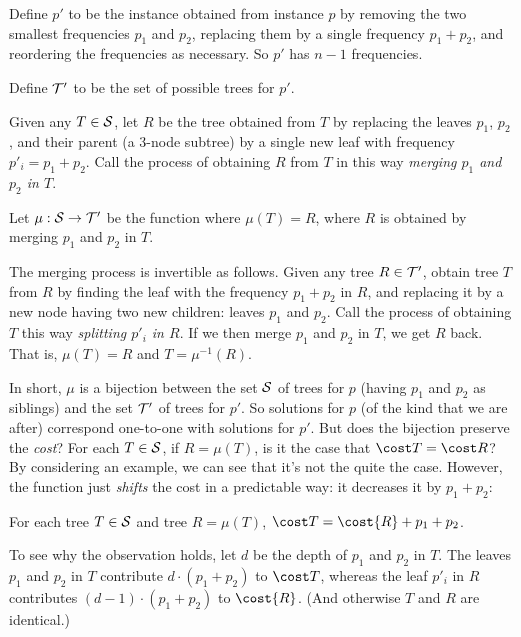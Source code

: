 \begin{definition}%
  Define $p'$ to be the instance 
  obtained from instance $p$ by removing the two smallest frequencies $p_1$ and $p_2$,
  replacing them by a single frequency $p_1+p_2$, 
  and reordering the frequencies as necessary. 
  So $p'$ has $n-1$ frequencies.

  Define ${\cal T}'$ to be the set of possible trees for $p'$.

  Given any $T\in{\cal S}$,
  let $R$ be the tree obtained from $T$
  by replacing the leaves $p_1$, $p_2$, and their parent (a 3-node subtree)
  by a single new leaf with frequency $p'_i = p_1+p_2$.
  Call the process of obtaining $R$ from $T$ in this way
  \emph{merging $p_1$ and $p_2$ in $T$}.

  Let $\mu:{\cal S} \rightarrow {\cal T}'$ be the function
  where $\mu(T) = R$, where $R$ is obtained by merging $p_1$ and $p_2$ in $T$.
\end{definition}
The merging process is invertible as follows.
Given any tree $R\in{\cal T}'$,  obtain tree $T$ from $R$
by finding the leaf with the frequency $p_1+p_2$ in $R$,
and replacing it by a new node having two new children: leaves $p_1$ and $p_2$.
Call the process of obtaining $T$ this way \emph{splitting $p'_i$ in $R$}.
If we then merge $p_1$ and $p_2$ in $T$, we get $R$ back.
That is, $\mu(T) = R$ and $T = \mu^{-1}(R)$.

In short, $\mu$ is a bijection between the set ${\cal S}$ of trees for $p$
(having $p_1$ and $p_2$ as siblings)
and the set ${\cal T}'$ of trees for $p'$.
So solutions for $p$ (of the kind that we are after)
correspond one-to-one with solutions for $p'$.
But does the bijection preserve the \emph{cost}?
For each $T\in{\cal S}$, if $R=\mu(T)$,
is it the case that $\cost T = \cost R$?
By considering an example, we can see that it's not the quite the case.
However, the function just \emph{shifts} the cost in a predictable way: it decreases it by $p_1+p_2$:

\begin{observation}\label{greedy: bijection}
  For each tree $T\in{\cal S}$ and tree $R=\mu(T)$, $\cost T = \cost {R} + p_1 + p_2$.
\end{observation}

To see why the observation holds, let $d$ be the depth of $p_1$ and $p_2$ in $T$.
The leaves $p_1$ and $p_2$ in $T$ contribute $d\cdot (p_1+p_2)$ to $\cost T$,
whereas the leaf $p'_i$ in $R$ contributes $(d-1)\cdot(p_1+p_2)$ to $\cost {R}$.
(And otherwise $T$ and $R$ are identical.)

